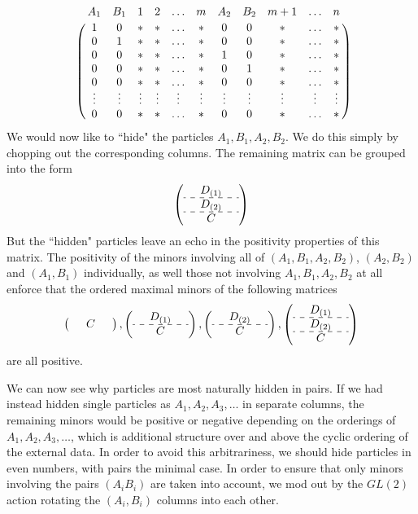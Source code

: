 \documentclass[12pt,nohyper,twosided]{JHEP3}
\newcommand{\be}{\begin{eqnarray}}
\newcommand{\ee}{\end{eqnarray}}
\begin{document}
$$\bordermatrix{\text{}&A_1&B_1&1&2&\ldots&m&A_2&B_2&m+1&\ldots&n\cr
               &1&0&\ast&\ast&\ldots&\ast&0&0&\ast&\ldots & \ast\cr
               &0&1&\ast&\ast&\ldots&\ast&0&0&\ast&\ldots & \ast\cr
               &0&0&\ast&\ast&\ldots&\ast&1&0&\ast&\ldots & \ast\cr
               &0&0&\ast&\ast&\ldots&\ast&0&1&\ast&\ldots & \ast\cr
               &0&0&\ast&\ast&\ldots&\ast&0&0&\ast&\ldots & \ast\cr
               &\vdots&\vdots&\vdots&\vdots&\vdots&\vdots&\vdots&\vdots&\vdots&\vdots&\vdots\cr
               &0&0&\ast&\ast&\ldots&\ast&0&0&\ast&\ldots & \ast\cr}$$
We would now like to ``hide" the particles $A_1,B_1,A_2,B_2$. We do
this simply by chopping out the corresponding columns. The remaining
matrix can be grouped into the form \be \left(\begin{array}{ccc}&
D_{(1)} & \\ \hdashline  & D_{(2)} & \\ \hdashline & C & \end{array}
\right) \ee But the ``hidden" particles leave an echo in the
positivity properties of this matrix. The positivity of the minors
involving all of $(A_1,B_1,A_2,B_2)$, $(A_2,B_2)$ and $(A_1,B_1)$
individually, as well those not involving $A_1,B_1,A_2,B_2$ at all
enforce that the ordered maximal minors of the following matrices
\be \left(\begin{array}{ccc} & C & \end{array} \right), \left(
\begin{array}{ccc}& D_{(1)}& \\ \hdashline & C & \end{array} \right),
\left( \begin{array}{ccc} &D_{(2)}& \\ \hdashline & C  & \end{array}
\right), \left(\begin{array}{ccc} &  D_{(1)}&  \\ \hdashline &
D_{(2)}&
\\ \hdashline &C& \end{array} \right) \ee are all positive.

We can now see why particles are most naturally hidden in pairs. If
we had instead hidden single particles as $A_1, A_2, A_3, \dots$ in
separate columns, the remaining minors would be positive or negative
depending on the orderings of $A_1,A_2,A_3, \dots$, which is
additional structure over and above the cyclic ordering of the
external data. In order to avoid this arbitrariness, we should hide
particles in even numbers, with pairs the minimal case. In order to
ensure that only minors involving the pairs $(A_i B_i)$ are taken into
account,  we mod out by the $GL(2)$ action rotating the $(A_i,B_i)$ columns
into each other.
\end{document}
